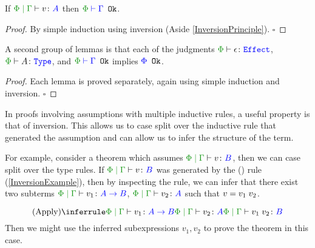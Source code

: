 \documentclass{Report}
\begin{document}
\begin{framed}
    
    \begin{lemma}
        If $\gpetyperelation{v}{A}$ then $\oke{\P}{\G}$.
    \end{lemma}
    \begin{proof}
        By simple induction using inversion (Aside \ref{InversionPrinciple}). $\square$
    \end{proof}
    
\end{framed}



\begin{framed}
    \begin{lemma}
        A second group of lemmas is that each of the judgments  $\wellformedeffect{\P}{\e}$, $\wellformedtype{\P}{A}$, and $\oke{\P}{\G}$ implies ${\color{blue} \Phi} \texttt{ Ok}$.
    \end{lemma}
    
    \begin{proof}
        Each lemma is proved separately, again using simple induction and inversion. $\square$
    \end{proof}
    
\end{framed}


\begin{framed}
    \begin{aside}\label{InversionPrinciple}
        

        In proofs involving assumptions with multiple inductive rules, a useful property is that of inversion. This allows us to case split over the inductive rule that generated the assumption and can allow us to infer the structure of the term.

        For example, consider a theorem which assumes $\gpetyperelation{v}{B}$, then we can case split over the type rules. If $\gpetyperelation{v}{B}$ was generated by the (\textit{\vapply}) rule (\ref{InversionExample}), then by inspecting the rule, we can infer that there exist two subterms $\gpetyperelation{v_1}{\ab}$, $\gpetyperelation{v_2}{A}$ such that $v = v_1\; v_2$. 

        \begin{equation}\label{InversionExample}
            \ntreeruleII{\vapply}{\gpetyperelation{v_1}{\ab}}{\gpetyperelation{v_2}{A}}{\gpetyperelation{\apply{v_1}{v_2}}{B}}
        \end{equation}
        Then we might use the inferred subexpressions $v_1, v_2$ to prove the theorem in this case.
    \end{aside}
        
    \end{framed}
\end{document}
